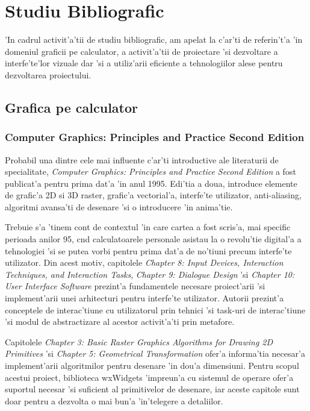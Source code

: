 \chapter{Studiu Bibliografic}
\pagestyle{headings}

'In cadrul activit'a'tii de studiu bibliografic, am apelat la c'ar'ti de referin't'a 'in domeniul graficii pe calculator, a activit'a'tii de proiectare 'si dezvoltare a interfe'te'lor vizuale dar 'si a utiliz'arii eficiente a tehnologiilor alese pentru dezvoltarea proiectului.

\section{Grafica pe calculator}

\subsection{Computer Graphics: Principles and Practice Second Edition}

Probabil una dintre cele mai influente c'ar'ti introductive ale literaturii de specialitate, \emph{Computer Graphics: Principles and Practice Second Edition} a fost publicat'a pentru prima dat'a 'in anul 1995. Edi'tia a doua, introduce elemente de grafic'a 2D si 3D raster, grafic'a vectorial'a, interfe'te utilizator, anti-aliasing, algoritmi avansa'ti de desenare 'si o introducere 'in anima'tie.

\medskip

Trebuie s'a 'tinem cont de contextul 'in care cartea a fost scris'a, mai specific perioada anilor 95, c{\ia}nd calculatoarele personale asistau la o revolu'tie digital'a a tehnologiei 'si se putea vorbi pentru prima dat'a de no'tiuni precum interfe'te utilizator. Din acest motiv, capitolele \emph{Chapter 8: Input Devices, Interaction Techniques, and Interaction Tasks}, \emph{Chapter 9: Dialogue Design} 'si \emph{Chapter 10: User Interface Software} prezint'a fundamentele necesare proiect'arii 'si implement'arii unei arhitecturi pentru interfe'te utilizator. Autorii prezint'a conceptele de interac'tiune cu utilizatorul prin tehnici 'si task-uri de interac'tiune 'si modul de abstractizare al acestor activit'a'ti prin metafore.

\medskip

Capitolele \emph{Chapter 3: Basic Raster Graphics Algorithms for Drawing 2D Primitives} 'si \emph{Chapter 5: Geometrical Transformation} ofer'a informa'tia necesar'a implement'arii algoritmilor pentru desenare 'in dou'a dimensiuni. Pentru scopul acestui proiect, biblioteca wxWidgets 'impreun'a cu sistemul de operare ofer'a suportul necesar 'si suficient al primitivelor de desenare, iar aceste capitole sunt doar pentru a dezvolta o mai bun'a 'in'telegere a detaliilor.

